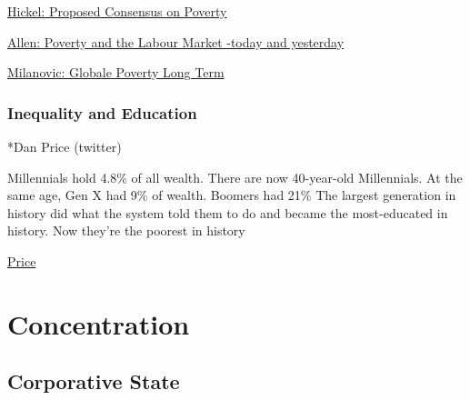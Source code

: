 \documentclass[
]{book}
\begin{document}
\href{https://www.cgdev.org/blog/12-things-we-can-agree-about-global-poverty}{Hickel: Proposed Consensus on Poverty}

\href{https://en.es1lib.org/book/11926264/191b2c}{Allen: Poverty and the Labour Market -today and yesterday}

\href{https://www.globalpolicyjournal.com/blog/11/02/2019/global-poverty-over-long-term-legitimate-issues}{Milanovic: Globale Poverty Long Term}

\hypertarget{inequality-and-education}{%
\subsection{Inequality and Education}\label{inequality-and-education}}

*Dan Price (twitter)

Millennials hold 4.8\% of all wealth. There are now 40-year-old Millennials.
At the same age, Gen X had 9\% of wealth. Boomers had 21\%
The largest generation in history did what the system told them to do and became the most-educated in history. Now they're the poorest in history

\href{https://twitter.com/DanPriceSeattle/status/1392571782155030530}{Price}

\hypertarget{concentration}{%
\chapter{Concentration}\label{concentration}}

\hypertarget{corporative-state}{%
\section{Corporative State}\label{corporative-state}}
\end{document}
